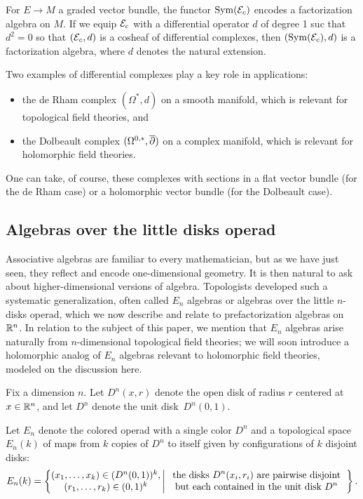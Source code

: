 \documentclass[11pt]{amsart}
\def\owen#1{{\textcolor{green!65!black}{OGG: {#1}}}}
\begin{document}
\begin{thm}[\owen{cite book}]
For $E \to M$ a graded vector bundle, the functor $\operatorname{Sym}(\mathcal E_c)$ encodes a factorization algebra on $M$.
If we equip $\mathcal E_c$ with a differential operator $d$ of degree 1 suc that $d^2 = 0$ so that $(\mathcal E_c, d)$ is a cosheaf of differential complexes,
then $(\operatorname{Sym}(\mathcal E_c), d)$ is a factorization algebra, where $d$ denotes the natural extension.
\end{thm}

Two examples of differential complexes play a key role in applications: 
\begin{itemize}
\item the de Rham complex $(\Omega^*, d)$ on a smooth manifold, which is relevant for topological field theories, and 
\item the Dolbeault complex $(\Omega^{0,*}, {\overline{\partial}})$ on a complex manifold, which is relevant for holomorphic field theories.
\end{itemize}
One can take, of course, these complexes with sections in a flat vector bundle (for the de Rham case) or a holomorphic vector bundle (for the Dolbeault case).

\subsection{Algebras over the little disks operad}

Associative algebras are familiar to every mathematician, but as we have just seen, they reflect and encode one-dimensional geometry.
It is then natural to ask about higher-dimensional versions of algebra.
Topologists developed such a systematic generalization, often called $E_n$ algebras or algebras over the little $n$-disks operad,
which we now describe and relate to prefactorization algebras on~$\mathbb R^n$.
In relation to the subject of this paper, we mention that $E_n$ algebras arise naturally from $n$-dimensional topological field theories;
we will soon introduce a holomorphic analog of $E_n$ algebras relevant to holomorphic field theories,
modeled on the discussion here.

Fix a dimension $n$. 
Let $D^n(x,r)$ denote the open disk of radius $r$ centered at $x \in \mathbb R^n$,
and let $D^n$ denote the unit disk~$D^n(0,1)$.

\begin{dfn}
Let $E_n$ denote the colored operad with a single color $D^n$ and a topological space $E_n(k)$ of maps from $k$ copies of $D^n$ to itself given by configurations of $k$ disjoint disks:
\[
E_n(k) = \left\{ \begin{matrix}(x_1, \ldots, x_k) \in (D^n(0,1))^k,\\ (r_1, \ldots, r_k) \in (0,1)^k\end{matrix} \,\bigg|\, \text{\begin{tabular}{c}the disks $D^n(x_i,r_i)$ are pairwise disjoint\\ but each contained in the unit disk $D^n$\end{tabular}}\right\}.
\]
\end{dfn}
\end{document}
